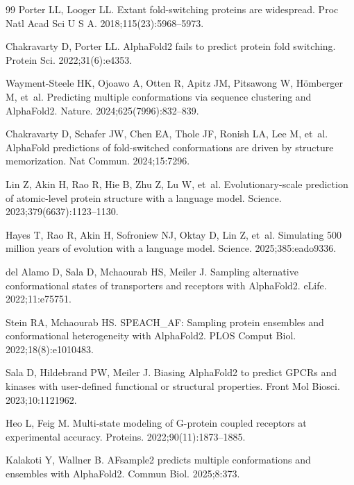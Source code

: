 \documentclass[10pt,a4paper]{article}
\begin{document}
\begin{thebibliography}{99}
Porter LL, Looger LL.
\newblock Extant fold-switching proteins are widespread.
\newblock Proc Natl Acad Sci U S A. 2018;115(23):5968--5973.

Chakravarty D, Porter LL.
\newblock AlphaFold2 fails to predict protein fold switching.
\newblock Protein Sci. 2022;31(6):e4353.

Wayment-Steele HK, Ojoawo A, Otten R, Apitz JM, Pitsawong W, H{\"o}mberger M, et~al.
\newblock Predicting multiple conformations via sequence clustering and AlphaFold2.
\newblock Nature. 2024;625(7996):832--839.

Chakravarty D, Schafer JW, Chen EA, Thole JF, Ronish LA, Lee M, et~al.
\newblock AlphaFold predictions of fold-switched conformations are driven by structure memorization.
\newblock Nat Commun. 2024;15:7296.

Lin Z, Akin H, Rao R, Hie B, Zhu Z, Lu W, et~al.
\newblock Evolutionary-scale prediction of atomic-level protein structure with a language model.
\newblock Science. 2023;379(6637):1123--1130.

Hayes T, Rao R, Akin H, Sofroniew NJ, Oktay D, Lin Z, et~al.
\newblock Simulating 500 million years of evolution with a language model.
\newblock Science. 2025;385:eado9336.

del Alamo D, Sala D, Mchaourab HS, Meiler J.
\newblock Sampling alternative conformational states of transporters and receptors with AlphaFold2.
\newblock eLife. 2022;11:e75751.

Stein RA, Mchaourab HS.
\newblock SPEACH\_AF: Sampling protein ensembles and conformational heterogeneity with AlphaFold2.
\newblock PLOS Comput Biol. 2022;18(8):e1010483.

Sala D, Hildebrand PW, Meiler J.
\newblock Biasing AlphaFold2 to predict GPCRs and kinases with user-defined functional or structural properties.
\newblock Front Mol Biosci. 2023;10:1121962.

Heo L, Feig M.
\newblock Multi-state modeling of G-protein coupled receptors at experimental accuracy.
\newblock Proteins. 2022;90(11):1873--1885.

Kalakoti Y, Wallner B.
\newblock AFsample2 predicts multiple conformations and ensembles with AlphaFold2.
\newblock Commun Biol. 2025;8:373.


\end{thebibliography}
\end{document}
